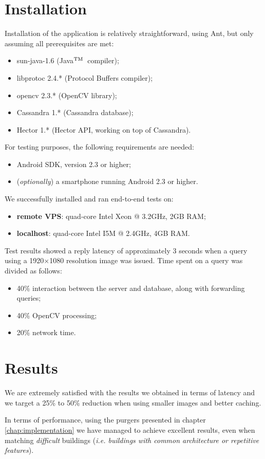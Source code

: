 \documentclass[a4paper,onecolumn,oneside,titlepage,11pt]{report}
\def\tm{\leavevmode\hbox{$\rm {}^{TM}$}}
\begin{document}
\section{Installation}
Installation of the application is relatively straightforward, using Ant, but only assuming all prerequisites are met:
\begin{itemize}
	\item sun-java-1.6 (Java\tm\ compiler);
	\item libprotoc 2.4.* (Protocol Buffers compiler);
	\item opencv 2.3.* (OpenCV library);
	\item Cassandra 1.* (Cassandra database);
	\item Hector 1.* (Hector API, working on top of Cassandra).
\end{itemize}
For testing purposes, the following requirements are needed:
\begin{itemize}
	\item Android SDK, version 2.3 or higher;
	\item (\emph{optionally}) a smartphone running Android 2.3 or higher.
\end{itemize}
We successfully installed and ran end-to-end tests on:
\begin{itemize}
	\item \textbf{remote VPS}: quad-core Intel Xeon @ 3.2GHz, 2GB RAM;
	\item \textbf{localhost}: quad-core Intel I5M @ 2.4GHz, 4GB RAM.
\end{itemize}

Test results showed a reply latency of approximately $3$ seconds when a query using a 1920$\times$1080 resolution image was issued. Time spent on a query was divided as follows:
\begin{itemize}
	\item 40\% interaction between the server and database, along with forwarding queries;
	\item 40\% OpenCV processing;
	\item 20\% network time.
\end{itemize}
\section{Results}
We are extremely satisfied with the results we obtained in terms of latency and we target a 25\% to 50\% reduction when using smaller images and better caching.

In terms of performance, using the purgers presented in chapter \ref{chap:implementation} we have managed to achieve excellent results, even when matching \emph{difficult} buildings (\emph{i.e. buildings with common architecture or repetitive features}).
\end{document}
